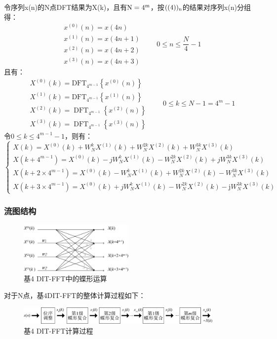 \documentclass{../source/Experiment}
\begin{document}
令序列x(n)的N点DFT结果为X(k)，且有$\rm N=4^m$，按$\rm ((4))_n$的结果对序列x(n)分组得：
$$
    \begin{aligned}
         & x^{(0)}(n)=x(4 n)   \\
         & x^{(1)}(n)=x(4 n+1) \\
         & x^{(2)}(n)=x(4 n+2) \\
         & x^{(3)}(n)=x(4 n+3)
    \end{aligned}
    \qquad 0 \leqslant n \leqslant \frac{N}{4}-1
$$
且有：
$$
    \begin{aligned}
         & X^{(0)}(k)=\mathrm{DFT}_{4^{m-1}}\left\{x^{(0)}(n)\right\}       \\
         & X^{(1)}(k)=\mathrm{DFT}_{4^{m-1}}\left\{x^{(1)}(n)\right\}       \\
         & X^{(2)}(k)=\operatorname{DFT}_{4^{m-1}}\left\{x^{(2)}(n)\right\} \\
         & X^{(3)}(k)=\operatorname{DFT}_{4^{m-1}}\left\{x^{(3)}(n)\right\}
    \end{aligned}
    \qquad 0 \leqslant k \leqslant N-1=4^{m}-1
$$
令$0 \leqslant k \leqslant 4^{m-1}-1$，则有：
$$
    \left\{\begin{array}{l}
        X(k)=X^{(0)}(k)+W_{N}^{k} X^{(1)}(k)+W_{N}^{2 k} X^{(2)}(k)+W_{N}^{3 k} X^{(3)}(k)                             \\
        X\left(k+4^{m-1}\right)=X^{(0)}(k)-j W_{N}^{k} X^{(1)}(k)-W_{N}^{2 k} X^{(2)}(k)+j W_{N}^{3 k} X^{(3)}(k)      \\
        X\left(k+2 \times 4^{m-1}\right)=X^{(0)}(k)-W_{N}^{k} X^{(1)}(k)+W_{N}^{2 k} X^{(2)}(k)-W_{N}^{3 k} X^{(3)}(k) \\
        X\left(k+3 \times 4^{m-1}\right)=X^{(0)}(k)+j W_{N}^{k} X^{(1)}(k)-W_{N}^{2 k} X^{(2)}(k)-\mathrm{j} W_{N}^{3 k} X^{(3)}(k)
    \end{array}\right.
$$
\subsubsection{流图结构}
\begin{figure}[H]
    \centering
    \includegraphics[width = 0.5\textwidth]{pic/butterfly1.png}
    \caption{基4  DIT-FFT中的蝶形运算}
\end{figure}
对于N点，基4DIT-FFT的整体计算过程如下：
\begin{figure}[H]
    \centering
    \includegraphics[width = 0.9\textwidth]{pic/butterfly2.png}
    \caption{基4  DIT-FFT计算过程}
\end{figure}
\end{document}
